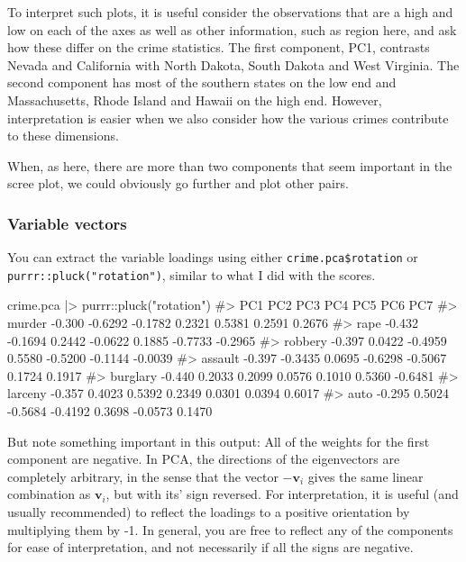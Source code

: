 \documentclass[
  letterpaper,
  10pt,
  krantz2]{krantz}
\makeatletter
\newenvironment{Shaded}{\begin{snugshade}}{\end{snugshade}}
\newcommand{\CommentTok}[1]{\textcolor[rgb]{0.37,0.37,0.37}{#1}}
\newcommand{\FunctionTok}[1]{\textcolor[rgb]{0.28,0.35,0.67}{#1}}
\newcommand{\NormalTok}[1]{\textcolor[rgb]{0.00,0.23,0.31}{#1}}
\newcommand{\SpecialCharTok}[1]{\textcolor[rgb]{0.37,0.37,0.37}{#1}}
\newcommand{\StringTok}[1]{\textcolor[rgb]{0.13,0.47,0.30}{#1}}
\newenvironment{kframe}{%
  \medskip{}
  \setlength{\fboxsep}{.8em}
  \def\at@end@of@kframe{}%
  \ifinner\ifhmode%
  \def\at@end@of@kframe{\end{minipage}}%
  \begin{minipage}{\columnwidth}%
  \fi\fi%
  \def\FrameCommand##1{\hskip\@totalleftmargin \hskip-\fboxsep
  \colorbox{shadecolor}{##1}\hskip-\fboxsep
      \hskip-\linewidth \hskip-\@totalleftmargin \hskip\columnwidth}%
  \MakeFramed {\advance\hsize-\width
    \@totalleftmargin\z@ \linewidth\hsize
    \@setminipage}}%
{\par\unskip\endMakeFramed%
  \at@end@of@kframe}
\renewenvironment{Shaded}{\begin{kframe}}{\end{kframe}}
\makeatother
\begin{document}
To interpret such plots, it is useful consider the observations that are
a high and low on each of the axes as well as other information, such as
region here, and ask how these differ on the crime statistics. The first
component, PC1, contrasts Nevada and California with North Dakota, South
Dakota and West Virginia. The second component has most of the southern
states on the low end and Massachusetts, Rhode Island and Hawaii on the
high end. However, interpretation is easier when we also consider how
the various crimes contribute to these dimensions.

When, as here, there are more than two components that seem important in
the scree plot, we could obviously go further and plot other pairs.

\subsubsection*{Variable vectors}\label{variable-vectors}

You can extract the variable loadings using either
\texttt{crime.pca\$rotation} or \texttt{purrr::pluck("rotation")},
similar to what I did with the scores.

\begin{Shaded}
\begin{Highlighting}[]
\NormalTok{crime.pca }\SpecialCharTok{|\textgreater{}}\NormalTok{ purrr}\SpecialCharTok{::}\FunctionTok{pluck}\NormalTok{(}\StringTok{"rotation"}\NormalTok{)}
\CommentTok{\#\textgreater{}             PC1     PC2     PC3     PC4     PC5     PC6     PC7}
\CommentTok{\#\textgreater{} murder   {-}0.300 {-}0.6292 {-}0.1782  0.2321  0.5381  0.2591  0.2676}
\CommentTok{\#\textgreater{} rape     {-}0.432 {-}0.1694  0.2442 {-}0.0622  0.1885 {-}0.7733 {-}0.2965}
\CommentTok{\#\textgreater{} robbery  {-}0.397  0.0422 {-}0.4959  0.5580 {-}0.5200 {-}0.1144 {-}0.0039}
\CommentTok{\#\textgreater{} assault  {-}0.397 {-}0.3435  0.0695 {-}0.6298 {-}0.5067  0.1724  0.1917}
\CommentTok{\#\textgreater{} burglary {-}0.440  0.2033  0.2099  0.0576  0.1010  0.5360 {-}0.6481}
\CommentTok{\#\textgreater{} larceny  {-}0.357  0.4023  0.5392  0.2349  0.0301  0.0394  0.6017}
\CommentTok{\#\textgreater{} auto     {-}0.295  0.5024 {-}0.5684 {-}0.4192  0.3698 {-}0.0573  0.1470}
\end{Highlighting}
\end{Shaded}

But note something important in this output: All of the weights for the
first component are negative. In PCA, the directions of the eigenvectors
are completely arbitrary, in the sense that the vector \(-\mathbf{v}_i\)
gives the same linear combination as \(\mathbf{v}_i\), but with its'
sign reversed. For interpretation, it is useful (and usually
recommended) to reflect the loadings to a positive orientation by
multiplying them by -1. In general, you are free to reflect any of the
components for ease of interpretation, and not necessarily if all the
signs are negative.
\end{document}
